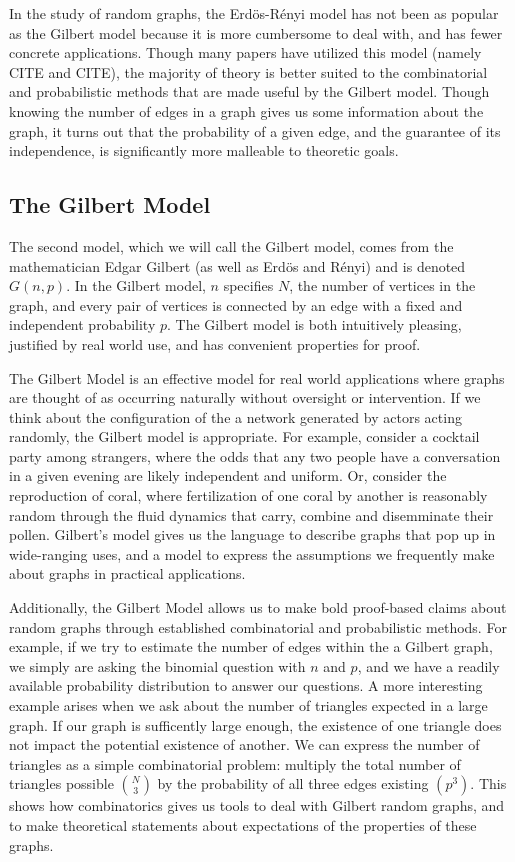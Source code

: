 \documentclass[11pt,a4paper]{report}
\begin{document}
In the study of random graphs, the Erd\"os-R\'enyi model has not been as popular as the Gilbert model because it is more cumbersome to deal with, and has fewer concrete applications.
Though many papers have utilized this model (namely CITE and CITE), the majority of theory is better suited to the combinatorial and probabilistic methods that are made useful by the Gilbert model.
Though knowing the number of edges in a graph gives us some information about the graph, it turns out that the probability of a given edge, and the guarantee of its independence, is significantly more malleable to theoretic goals.

\subsection{The Gilbert Model}

The second model, which we will call the Gilbert model, comes from the mathematician Edgar Gilbert (as well as Erd\"os and R\'enyi) and is denoted $G(n, p)$.
In the Gilbert model, $n$ specifies $N$, the number of vertices in the graph, and every pair of vertices is connected by an edge with a fixed and independent probability $p$.
The Gilbert model is both intuitively pleasing, justified by real world use, and has convenient properties for proof.

The Gilbert Model is an effective model for real world applications where graphs are thought of as occurring naturally without oversight or intervention.
If we think about the configuration of the a network generated by actors acting randomly, the Gilbert model is appropriate.
For example, consider a cocktail party among strangers, where the odds that any two people have a conversation in a given evening are likely independent and uniform.
Or, consider the reproduction of coral, where fertilization of one coral by another is reasonably random through the fluid dynamics that carry, combine and disemminate their pollen.
Gilbert's model gives us the language to describe graphs that pop up in wide-ranging uses, and a model to express the assumptions we frequently make about graphs in practical applications.

Additionally, the Gilbert Model allows us to make bold proof-based claims about random graphs through established combinatorial and probabilistic methods.
For example, if we try to estimate the number of edges within the a Gilbert graph, we simply are asking the binomial question with $n$ and $p$, and we have a readily available probability distribution to answer our questions.
A more interesting example arises when we ask about the number of triangles expected in a large graph.
If our graph is sufficently large enough, the existence of one triangle does not impact the potential existence of another.
We can express the number of triangles as a simple combinatorial problem: multiply the total number of triangles possible $\binom{N}{3}$ by the probability of all three edges existing $(p^3)$.
This shows how combinatorics gives us tools to deal with Gilbert random graphs, and to make theoretical statements about expectations of the properties of these graphs.
\end{document}
